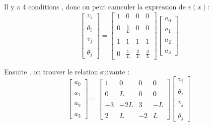 \documentclass[a4paper,10pt]{report} %
\begin{document}
Il y a 4 conditions  , donc on peut camculer la expression de $v(x)$:
\[ 
\left[ \begin{array}{c}v_i\\\\\theta_i\\\\v_j\\\\\theta_j\end{array} \right]
=\left[ \begin{array}{cccc}
1 & 0 & 0 & 0  \\\\
0 & \frac{1}{L} & 0 & 0 \\\\
1 & 1 &1 &1 \\\\
0 & \frac{1}{L} &\frac{2}{L} &\frac{3}{L} 
\end{array} \right]
\left[ \begin{array}{c}a_0\\\\a_1\\\\a_2\\\\a_3\end{array} \right]
\]

Ensuite , on trouver le relation suivante :
\[ 
\left[ \begin{array}{c}a_0\\\\a_1\\\\a_2\\\\a_3\end{array} \right]
=\left[ \begin{array}{cccc}
1 & 0 & 0 & 0  \\\\
0 & L & 0 & 0 \\\\
-3 & -2L &3 &-L \\\\
2 & L & -2 &L
\end{array} \right]
\left[ \begin{array}{c}v_i\\\\\theta_i\\\\v_j\\\\\theta_j\end{array} \right]
\]
\end{document}
